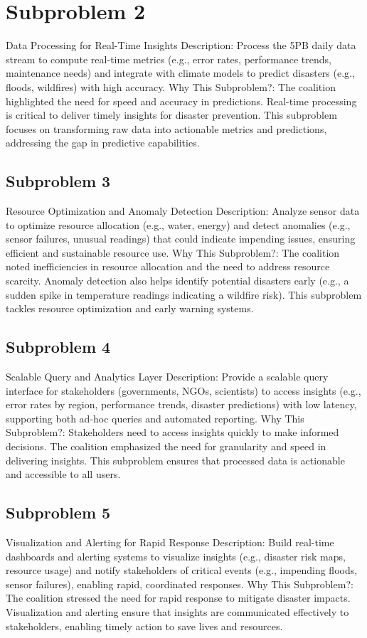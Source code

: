 \documentclass[10pt]{article}
\begin{document}
\section{Subproblem 2} Data Processing for Real-Time Insights
Description: Process the 5PB daily data stream to compute real-time metrics (e.g., error rates, performance trends, maintenance needs) and integrate with climate models to predict disasters (e.g., floods, wildfires) with high accuracy.
Why This Subproblem?: The coalition highlighted the need for speed and accuracy in predictions. Real-time processing is critical to deliver timely insights for disaster prevention. This subproblem focuses on transforming raw data into actionable metrics and predictions, addressing the gap in predictive capabilities.
\subsection{Subproblem 3} Resource Optimization and Anomaly Detection
Description: Analyze sensor data to optimize resource allocation (e.g., water, energy) and detect anomalies (e.g., sensor failures, unusual readings) that could indicate impending issues, ensuring efficient and sustainable resource use.
Why This Subproblem?: The coalition noted inefficiencies in resource allocation and the need to address resource scarcity. Anomaly detection also helps identify potential disasters early (e.g., a sudden spike in temperature readings indicating a wildfire risk). This subproblem tackles resource optimization and early warning systems.
\subsection{Subproblem 4} Scalable Query and Analytics Layer
Description: Provide a scalable query interface for stakeholders (governments, NGOs, scientists) to access insights (e.g., error rates by region, performance trends, disaster predictions) with low latency, supporting both ad-hoc queries and automated reporting.
Why This Subproblem?: Stakeholders need to access insights quickly to make informed decisions. The coalition emphasized the need for granularity and speed in delivering insights. This subproblem ensures that processed data is actionable and accessible to all users.
\subsection{Subproblem 5} Visualization and Alerting for Rapid Response
Description: Build real-time dashboards and alerting systems to visualize insights (e.g., disaster risk maps, resource usage) and notify stakeholders of critical events (e.g., impending floods, sensor failures), enabling rapid, coordinated responses.
Why This Subproblem?: The coalition stressed the need for rapid response to mitigate disaster impacts. Visualization and alerting ensure that insights are communicated effectively to stakeholders, enabling timely action to save lives and resources.
\end{document}
